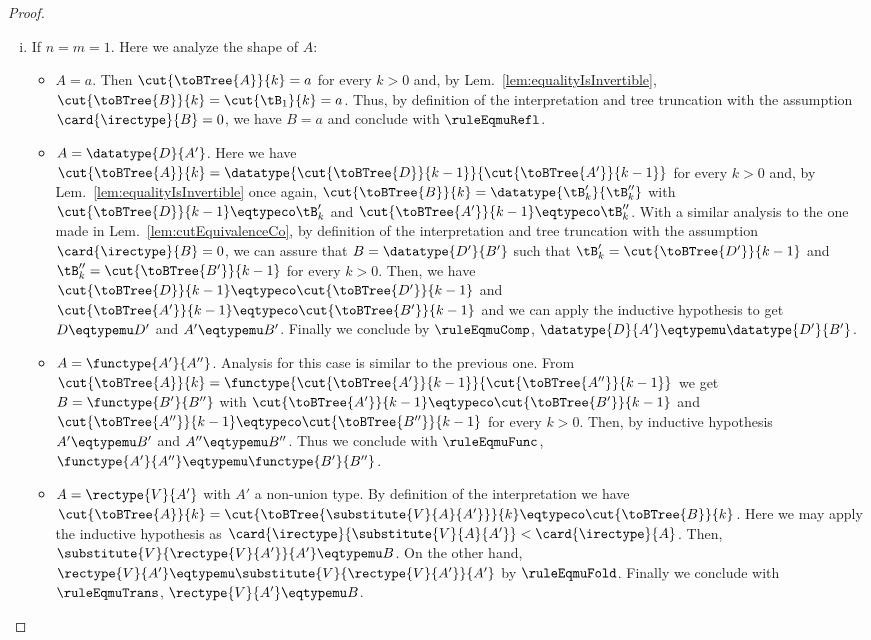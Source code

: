 \begin{proof}
\begin{enumerate}[(i)]
  \item If $n = m = 1$. Here we analyze the shape of $A$:
  \begin{itemize}
    \item $A = a$. Then $\cut{\toBTree{A}}{k} = a$ for every $k > 0$ and, by
    Lem.~\ref{lem:equalityIsInvertible}, $\cut{\toBTree{B}}{k} = \cut{\tB_1}{k}
    = a$. Thus, by definition of the interpretation and tree truncation with
    the assumption $\card{\irectype}{B} = 0$, we have $B = a$ and conclude with
    $\ruleEqmuRefl$.
    
    \item $A = \datatype{D}{A'}$. Here we have $\cut{\toBTree{A}}{k} =
    \datatype{\cut{\toBTree{D}}{k-1}}{\cut{\toBTree{A'}}{k-1}}$ for every $k >
    0$ and, by Lem.~\ref{lem:equalityIsInvertible} once again,
    $\cut{\toBTree{B}}{k} = \datatype{\tB'_k}{\tB''_k}$ with
    $\cut{\toBTree{D}}{k-1} \eqtypeco \tB'_k$ and $\cut{\toBTree{A'}}{k-1}
    \eqtypeco \tB''_k$. With a similar analysis to the one made in
    Lem.~\ref{lem:cutEquivalenceCo}, by definition of the interpretation and
    tree truncation with the assumption $\card{\irectype}{B} = 0$, we can
    assure that $B = \datatype{D'}{B'}$ such that $\tB'_k =
    \cut{\toBTree{D'}}{k-1}$ and $\tB''_k = \cut{\toBTree{B'}}{k-1}$ for every
    $k > 0$. Then, we have $\cut{\toBTree{D}}{k-1} \eqtypeco
    \cut{\toBTree{D'}}{k-1}$ and $\cut{\toBTree{A'}}{k-1} \eqtypeco
    \cut{\toBTree{B'}}{k-1}$ and we can apply the inductive hypothesis to get
    $D \eqtypemu D'$ and $A' \eqtypemu B'$. Finally we conclude by
    $\ruleEqmuComp$, $\datatype{D}{A'} \eqtypemu \datatype{D'}{B'}$.

    \item $A = \functype{A'}{A''}$. Analysis for this case is similar to the
    previous one. From $\cut{\toBTree{A}}{k} =
    \functype{\cut{\toBTree{A'}}{k-1}}{\cut{\toBTree{A''}}{k-1}}$ we get $B =
    \functype{B'}{B''}$ with $\cut{\toBTree{A'}}{k-1} \eqtypeco
    \cut{\toBTree{B'}}{k-1}$ and $\cut{\toBTree{A''}}{k-1} \eqtypeco
    \cut{\toBTree{B''}}{k-1}$ for every $k > 0$. Then, by inductive hypothesis
    $A' \eqtypemu B'$ and $A'' \eqtypemu B''$. Thus we conclude with
    $\ruleEqmuFunc$, $\functype{A'}{A''} \eqtypemu \functype{B'}{B''}$.

    \item $A = \rectype{V}{A'}$ with $A'$ a non-union type. By definition of
    the interpretation we have $\cut{\toBTree{A}}{k} =
    \cut{\toBTree{\substitute{V}{A}{A'}}}{k} \eqtypeco \cut{\toBTree{B}}{k}$.
    Here we may apply the inductive hypothesis as
    $\card{\irectype}{\substitute{V}{A}{A'}} < \card{\irectype}{A}$. Then,
    $\substitute{V}{\rectype{V}{A'}}{A'} \eqtypemu B$. On the other hand,
    $\rectype{V}{A'} \eqtypemu \substitute{V}{\rectype{V}{A'}}{A'}$ by
    $\ruleEqmuFold$. Finally we conclude with $\ruleEqmuTrans$,
    $\rectype{V}{A'} \eqtypemu B$.
  \end{itemize}
  

\end{enumerate}
\end{proof}

